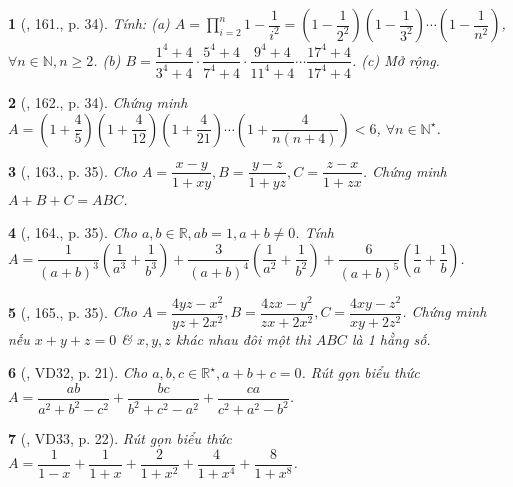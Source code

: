 \documentclass{article}
\newtheorem{baitoan}{}
\begin{document}
\begin{baitoan}[\cite{Tuyen_Toan_8}, 161., p. 34]
	Tính: (a) $A = \prod_{i=2}^n 1 - \dfrac{1}{i^2} = \left(1 - \dfrac{1}{2^2}\right)\left(1 - \dfrac{1}{3^2}\right)\cdots\left(1 - \dfrac{1}{n^2}\right)$, $\forall n\in\mathbb{N},n\ge2$. (b) $B = \dfrac{1^4 + 4}{3^4 + 4}\cdot\dfrac{5^4 + 4}{7^4 + 4}\cdot\dfrac{9^4 + 4}{11^4 + 4}\cdots\dfrac{17^4 + 4}{17^4 + 4}$. (c) Mở rộng.
\end{baitoan}

\begin{baitoan}[\cite{Tuyen_Toan_8}, 162., p. 34]
	Chứng minh $A = \left(1 + \dfrac{4}{5}\right)\left(1 + \dfrac{4}{12}\right)\left(1 + \dfrac{4}{21}\right)\cdots\left(1 + \dfrac{4}{n(n + 4)}\right) < 6$, $\forall n\in\mathbb{N}^\star$.
\end{baitoan}

\begin{baitoan}[\cite{Tuyen_Toan_8}, 163., p. 35]
	Cho $A = \dfrac{x - y}{1 + xy},B = \dfrac{y - z}{1 + yz},C = \dfrac{z - x}{1 + zx}$. Chứng minh $A + B + C = ABC$.
\end{baitoan}

\begin{baitoan}[\cite{Tuyen_Toan_8}, 164., p. 35]
	Cho $a,b\in\mathbb{R},ab = 1,a + b\ne0$. Tính $A = \dfrac{1}{(a + b)^3}\left(\dfrac{1}{a^3} + \dfrac{1}{b^3}\right) + \dfrac{3}{(a + b)^4}\left(\dfrac{1}{a^2} + \dfrac{1}{b^2}\right) + \dfrac{6}{(a + b)^5}\left(\dfrac{1}{a} + \dfrac{1}{b}\right)$.
\end{baitoan}

\begin{baitoan}[\cite{Tuyen_Toan_8}, 165., p. 35]
	Cho $A = \dfrac{4yz - x^2}{yz + 2x^2},B = \dfrac{4zx - y^2}{zx + 2x^2},C = \dfrac{4xy - z^2}{xy + 2z^2}$. Chứng minh nếu $x + y + z = 0$ \& $x,y,z$ khác nhau đôi một thì $ABC$ là 1 hằng số.
\end{baitoan}

\begin{baitoan}[\cite{Binh_Toan_8_tap_1}, VD32, p. 21]
	Cho $a,b,c\in\mathbb{R}^\star,a + b + c = 0$. Rút gọn biểu thức $A = \dfrac{ab}{a^2 + b^2 - c^2} + \dfrac{bc}{b^2 + c^2 - a^2} + \dfrac{ca}{c^2 + a^2 - b^2}$.
\end{baitoan}

\begin{baitoan}[\cite{Binh_Toan_8_tap_1}, VD33, p. 22]
	Rút gọn biểu thức $A = \dfrac{1}{1 - x} + \dfrac{1}{1 + x} + \dfrac{2}{1 + x^2} + \dfrac{4}{1 + x^4} + \dfrac{8}{1 + x^8}$.
\end{baitoan}
\end{document}
